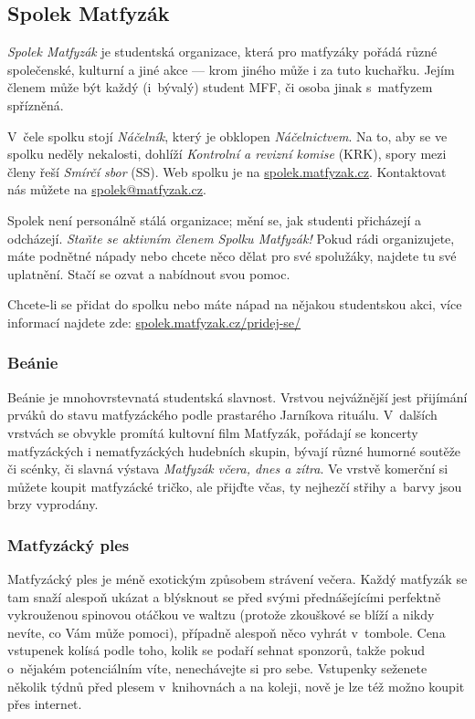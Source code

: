 \subsection{Spolek Matfyzák}

{\it Spolek Matfyzák\/} je studentská organizace, která pro matfyzáky pořádá různé spo\-le\-čen\-ské, kulturní a jiné akce --- krom jiného může i za tuto kuchařku.
Jejím členem může být každý
(i~bývalý) student MFF, či osoba jinak s~matfyzem spřízněná.


V~čele spolku stojí {\it Náčelník}, který je obklopen {\it
Náčelnictvem}. Na to, aby se ve spolku neděly nekalosti, dohlíží
{\it Kontrolní a revizní komise} (KRK), spory mezi členy řeší {\it
Smírčí sbor} (SS). Web spolku je na \url{spolek.matfyzak.cz}. Kontaktovat nás můžete na \url{spolek@matfyzak.cz}.

Spolek není personálně stálá
organizace; mění se, jak studenti přicházejí a od\-chá\-zejí. {\it
Staňte se aktivním členem Spolku Matfyzák!} Pokud rádi
organizujete, máte podnětné nápady nebo chcete něco dělat pro své
spolužáky, najdete tu své uplatnění. Stačí se ozvat a nabídnout
svou pomoc.

Chcete-li se přidat do spolku nebo máte nápad na nějakou studentskou akci, více informací najdete zde: \url{spolek.matfyzak.cz/pridej-se/}


\subsubsection{Beánie}

Beánie je mnohovrstevnatá studentská slavnost. Vrstvou nejvážnější jest
přijímání prváků do stavu matfyzáckého podle prastarého Jarníkova
rituálu. V~dalších vrstvách se obvykle promítá kultovní film
Matfyzák, pořádají se koncerty matfyzáckých i nematfyzáckých hudebních
skupin, bývají různé humorné soutěže či scénky, či slavná výstava
{\it Matfyzák včera, dnes a zítra}. Ve vrstvě komerční si můžete
koupit matfyzácké tričko, ale přijďte včas, ty nejhezčí střihy
a~barvy jsou brzy vyprodány.

\subsubsection{Matfyzácký ples}

Matfyzácký ples je méně exotickým způsobem strávení večera. Každý matfyzák se tam snaží alespoň ukázat a blýsknout se
před svými přednášejícími perfektně vykrouženou spinovou otáčkou
ve waltzu (protože zkouškové se blíží a nikdy nevíte, co Vám může
pomoci), případně alespoň něco vyhrát v~tombole. Cena vstupenek
kolísá podle toho, kolik se podaří sehnat sponzorů, takže pokud
o~nějakém potenciálním víte, nenechávejte si pro sebe. Vstupenky
seženete několik týdnů před plesem v~knihovnách a na koleji, nově je lze též možno koupit přes internet.

